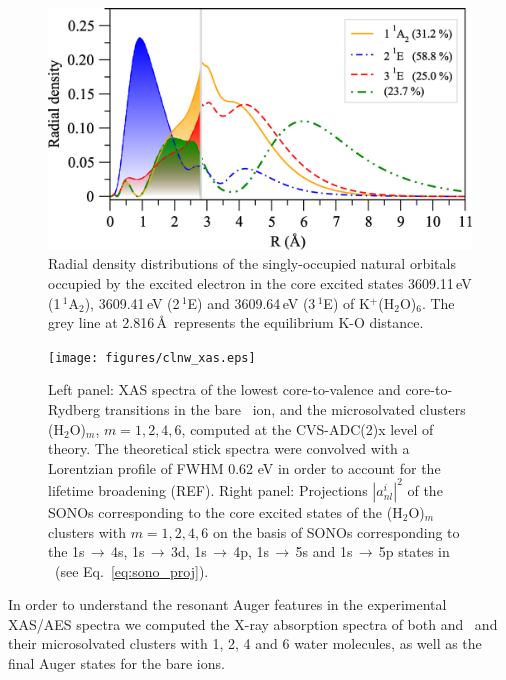 \begin{figure}
\centering
\includegraphics[scale=0.3]{figures/fg2_k_6w_okxx_55_rad_dens.eps}
\caption{Radial density distributions of the singly-occupied natural orbitals occupied by the excited electron in the core excited states 3609.11\,eV (1\,$^{1}$A$_{2}$), 3609.41\,eV (2\,$^{1}$E) and 3609.64\,eV (3\,$^{1}$E) of K$^{+}$(H$_2$O)$_6$. The grey line at 2.816\,\AA~represents the equilibrium K-O distance.}
\label{fg:rad_dens}
\end{figure}



\begin{figure}
\centering
\texttt{[image: figures/clnw\_xas.eps]}
\caption{Left panel: XAS spectra of the lowest core-to-valence and core-to-Rydberg transitions in the bare \cli~ion, and the microsolvated clusters \cli(H$_2$O)$_m$, $m = 1, 2, 4, 6$, computed at the CVS-ADC(2)x level of theory. The theoretical stick spectra were convolved with a Lorentzian profile of FWHM 0.62 eV in order to account for the lifetime broadening (REF). Right panel: Projections $|a_{nl}^{i}|^2$ of the SONOs corresponding to the core excited states of the \cli(H$_2$O)$_m$ clusters with $m = 1, 2, 4, 6$ on the basis of SONOs corresponding to the 1s$\,\rightarrow\,$4s, 1s$\,\rightarrow\,$3d, 1s$\,\rightarrow\,$4p, 1s$\,\rightarrow\,$5s and 1s$\,\rightarrow\,$5p states in \cli~(see Eq.\ \eqref{eq:sono_proj}).}
\label{fg:clnw_xas}
\end{figure}


In order to understand the resonant Auger features in the experimental XAS/AES spectra we computed the X-ray absorption spectra of both \cli and \ki~and their microsolvated clusters with 1, 2, 4 and 6 water molecules, as well as the final Auger states for the bare ions.


